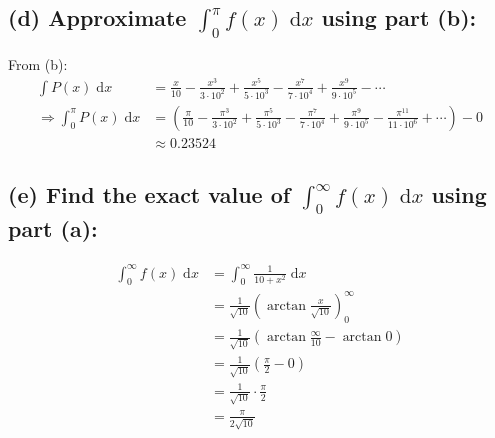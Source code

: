 \documentclass[12pt]{article}
\begin{document}
\subsection*{(d) Approximate $\displaystyle \int_0^{\pi} f(x) \;\mathrm{d}x$ using part (b):}

From (b):
\begin{align*}
    \int P(x)\;\mathrm{d}x
    &= \frac{x}{10}
    - \frac{x^3}{3\cdot 10^2}
    + \frac{x^5}{5\cdot 10^3}
    - \frac{x^7}{7\cdot 10^4}
    + \frac{x^9}{9\cdot 10^5}
    - \cdots\\
    \Longrightarrow
    \int_0^{\pi} P(x) \;\mathrm{d}x
    &=\left( \frac{\pi}{10}
    - \frac{\pi^3}{3\cdot 10^2}
    + \frac{\pi^5}{5\cdot 10^3}
    - \frac{\pi^7}{7\cdot 10^4}
    + \frac{\pi^9}{9\cdot 10^5}
    - \frac{\pi^{11}}{11\cdot 10^6}
    + \cdots\right)-0\\
    & \approx 0.23524
\end{align*}














\subsection*{(e) Find the exact value of ${\displaystyle \int_0^{\infty} f(x) \;\mathrm{d}x}$ using part (a):}
\begin{align*}
    \int_0^{\infty} f(x) \;\mathrm{d}x &= \int_0^{\infty} \frac{1}{10+x^2} \;\mathrm{d}x\\
    &= \frac{1}{\sqrt{10}} \left( \arctan{\frac{x}{\sqrt{10}}} \right)_0^{\infty}\\
    &= \frac{1}{\sqrt{10}} \left( \arctan{\frac{\infty}{10}} -\arctan{0} \right)\\
    &= \frac{1}{\sqrt{10}} \left( \frac{\pi}{2} -0 \right)\\
    &= \frac{1}{\sqrt{10}}\cdot \frac{\pi}{2} \\
    &= \frac{\pi}{2\sqrt{10}}\\
\end{align*}
\end{document}
